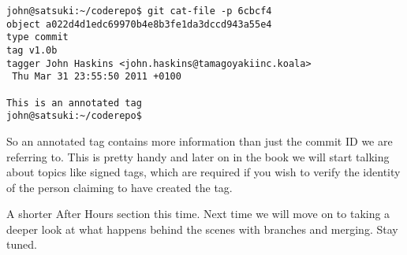 \begin{Verbatim}
john@satsuki:~/coderepo$ git cat-file -p 6cbcf4
object a022d4d1edc69970b4e8b3fe1da3dccd943a55e4
type commit
tag v1.0b
tagger John Haskins <john.haskins@tamagoyakiinc.koala> 
 Thu Mar 31 23:55:50 2011 +0100

This is an annotated tag
john@satsuki:~/coderepo$ 
\end{Verbatim}

So an annotated tag contains more information than just the commit ID we are referring to.  This is pretty handy and later on in the book we will start talking about topics like signed tags, which are required if you wish to verify the identity of the person claiming to have created the tag.

A shorter After Hours section this time.  Next time we will move on to taking a deeper look at what happens behind the scenes with branches and merging.  Stay tuned.

